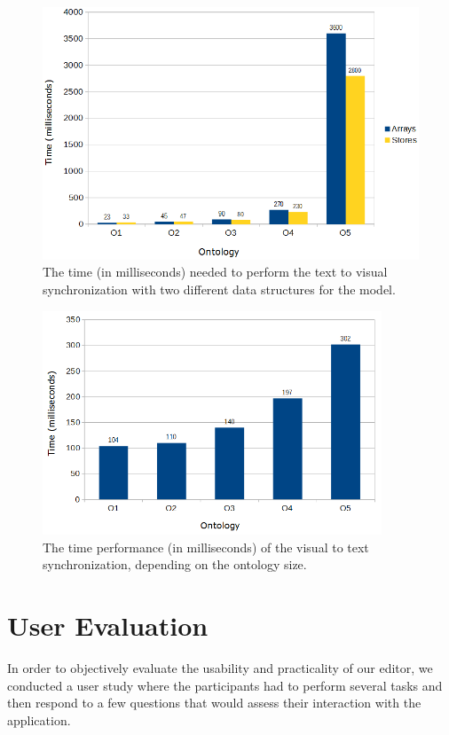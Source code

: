 \begin{figure}[]
	\centering
  	\centerline{\includegraphics[width = \textwidth]{img/arrayVSstore.png}}
	\caption{The time (in milliseconds) needed to perform the text to visual synchronization with two different data structures for the model.}
	\label{img:arrayVSstore}
\end{figure}

\begin{figure}[]	
  	\includegraphics[width = 0.9\textwidth]{img/text_sync.png}
	\caption{The time performance (in milliseconds) of the visual to text synchronization, depending on the ontology size.}
	\label{img:text_sync}
\end{figure}


\section {User Evaluation}

In order to objectively evaluate the usability and practicality of our editor, we conducted a user study where the participants had to perform several tasks and then respond to a few questions that would assess their interaction with the application.

